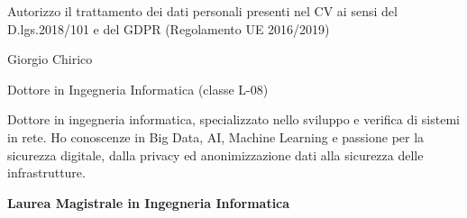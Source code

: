 \documentclass[a4paper]{letter}
\begin{document}
\begin{minipage}[t]{0.65\textwidth}
\setlength{\baselineskip}{1.4\baselineskip}

{\tiny Autorizzo il trattamento dei dati personali presenti nel CV ai sensi del D.lgs.2018/101 e del GDPR (Regolamento UE 2016/2019)}
\vspace{0.3cm}


{\huge Giorgio Chirico}

{\large Dottore in Ingegneria Informatica (classe L-08)}

\vspace{0.5cm}
 
Dottore in ingegneria informatica, specializzato nello sviluppo e verifica di sistemi in rete. Ho conoscenze in Big Data, AI, Machine Learning e passione per la sicurezza digitale, dalla privacy ed anonimizzazione dati alla sicurezza delle infrastrutture.


\vspace{0.15cm}

\makeatletter
\newcommand{\FormazioneBox}{%
}
\makeatother

\FormazioneBox

\vspace{0.8 cm}

{\large \textbf{Laurea Magistrale in Ingegneria Informatica}}


\end{minipage}
\end{document}
